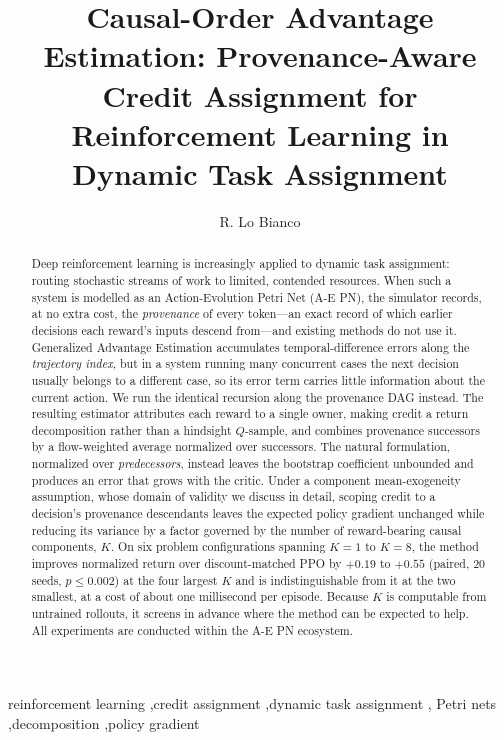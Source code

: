 \documentclass[review,authoryear,3p,times]{elsarticle}
\begin{document}
\begin{frontmatter}

\title{Causal-Order Advantage Estimation: Provenance-Aware Credit
Assignment for Reinforcement Learning in Dynamic Task Assignment}

\author[tue]{R. Lo Bianco}
\address[tue]{Eindhoven University of Technology, The Netherlands}

\begin{abstract}
Deep reinforcement learning is increasingly applied to dynamic task assignment:
routing stochastic streams of work to limited, contended resources. When such a
system is modelled as an Action-Evolution Petri Net (A-E PN), the simulator
records, at no extra cost, the \emph{provenance} of every token---an exact
record of which earlier decisions each reward's inputs descend from---and
existing methods do not use it. Generalized Advantage Estimation accumulates
temporal-difference errors along the \emph{trajectory index}, but in a system
running many concurrent cases the next decision usually belongs to a different
case, so its error term carries little information about the current action. We
run the identical recursion along the provenance DAG instead. The resulting
estimator attributes each reward to a single owner, making credit a return
decomposition rather than a hindsight $Q$-sample, and combines provenance
successors by a flow-weighted average normalized over successors. The natural
formulation, normalized over \emph{predecessors}, instead leaves the bootstrap
coefficient unbounded and produces an error that grows with the critic. Under a
component mean-exogeneity assumption, whose domain of validity we discuss in
detail, scoping credit to a decision's provenance descendants leaves the
expected policy gradient unchanged while reducing its variance by a factor
governed by the number of reward-bearing causal components, $K$. On six problem
configurations spanning $K=1$ to $K=8$, the method improves normalized return
over discount-matched PPO by $+0.19$ to $+0.55$ (paired, $20$ seeds,
$p\le0.002$) at the four largest $K$ and is indistinguishable from it at the
two smallest, at a cost of about one millisecond per episode. Because $K$ is
computable from untrained rollouts, it screens in advance where the method can
be expected to help. All experiments are conducted within the A-E PN ecosystem.
\end{abstract}

\begin{keyword}
reinforcement learning \sep credit assignment \sep dynamic task assignment \sep
Petri nets \sep decomposition \sep policy gradient
\end{keyword}

\end{frontmatter}
\end{document}
